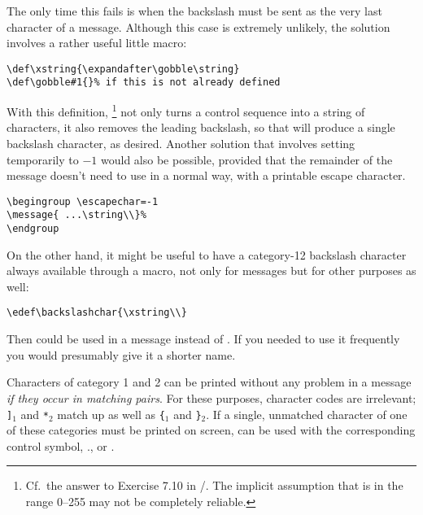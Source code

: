 {\begin{description}
 The only time this fails is when the backslash must be sent as the
very last character of a message. Although this case is
extremely unlikely, the solution involves a rather useful
little macro:
\begin{verbatim}
\def\xstring{\expandafter\gobble\string}
\def\gobble#1{}% if this is not already defined
\end{verbatim}
With this definition,%
\footnote{Cf.\ the answer to Exercise 7.10 in \texbook/. The implicit
assumption that  is in the range 0--255 may not be
completely reliable.}
 not only turns a control sequence into a string of
characters, it also removes the leading backslash, so that
 will produce a single backslash
character, as desired.
Another solution that involves setting 
temporarily to $-1$ would also be possible, provided that the remainder
of the message doesn't need to use  in a normal way,
with a printable escape character.
\begin{verbatim}
\begingroup \escapechar=-1
\message{ ...\string\\}%
\endgroup
\end{verbatim}
On the other hand,
it might be useful to have a category-12
backslash character always available through a macro,
not only for messages but for other purposes as well:
\begin{verbatim}
\edef\backslashchar{\xstring\\}
\end{verbatim}
Then  could be used in a message instead of
. If you needed to use it frequently you
would presumably give it a shorter name.

\item[Categories 1 and 2] Characters of category 1 and 2 can be
printed without any problem in a message {\em if they occur
in matching pairs}. For these purposes, character codes are irrelevant;
\verb;];$_1$ and \verb;*;$_2$ match up as well
as \verb;{;$_1$ and \verb;};$_2$.
If a single, unmatched character of one of these categories
must be printed on screen,  can be used with the
corresponding
control symbol, \eg.,  or
.


\end{description}}
